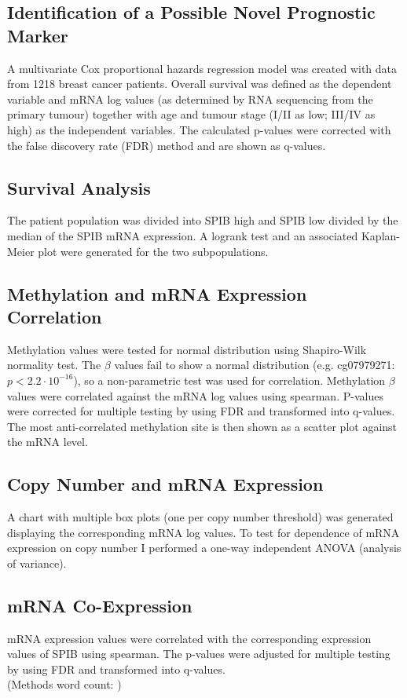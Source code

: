\subsection{Identification of a Possible Novel Prognostic Marker}

A multivariate Cox proportional hazards regression model was created with data from 1218 breast cancer patients.
Overall survival was defined as the dependent variable and mRNA log values (as determined by RNA sequencing from the primary tumour) together with age and tumour stage (I/II as low; III/IV as high) as the independent variables.
The calculated p-values were corrected with the false discovery rate (FDR) method and are shown as q-values.

\subsection{Survival Analysis}

The patient population was divided into SPIB high and SPIB low divided by the median of the SPIB mRNA expression.
A logrank test and an associated Kaplan-Meier plot were generated for the two subpopulations.

\subsection{Methylation and mRNA Expression Correlation}

Methylation values were tested for normal distribution using Shapiro-Wilk normality test.
The $\beta$ values fail to show a normal distribution (e.g. cg07979271: ${p < 2.2 \cdot 10^{-16}}$), so a non-parametric test was used for correlation.
Methylation $\beta$ values were correlated against the mRNA log values using spearman.
P-values were corrected for multiple testing by using FDR and transformed into q-values.
The most anti-correlated methylation site is then shown as a scatter plot against the mRNA level.

\subsection{Copy Number and mRNA Expression}

A chart with multiple box plots (one per copy number threshold) was generated displaying the corresponding mRNA log values.
To test for dependence of mRNA expression on copy number I performed a one-way independent ANOVA (analysis of variance).

\subsection{mRNA Co-Expression}

mRNA expression values were correlated with the corresponding expression values of SPIB using spearman.
The p-values were adjusted for multiple testing by using FDR and transformed into q-values.
\\
\endcountem
(Methods word count: \thewordcount{})